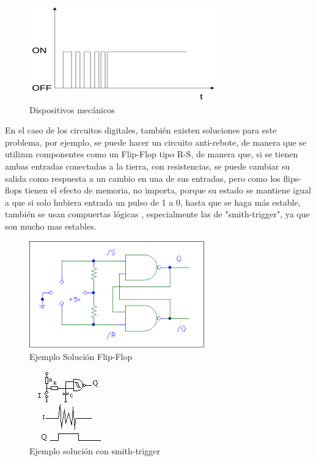 \documentclass[journal,trans]{IEEEtran}
\begin{document}
	\begin{figure}[hbtp]
		\centering
		\includegraphics[scale = 0.5]{imagenes/efectoRebote.png}
		\caption[Figura1]{Dispositivos mecánicos \cite{rebote}}
		\label{fig:EfectoRebo}
	\end{figure}
	
	
	En el caso de los circuitos digitales, también existen soluciones para este problema, por ejemplo, se puede hacer un circuito anti-rebote, de manera que se utilizan componentes como un Flip-Flop tipo  R-S, de manera que, si se tienen ambas entradas conectadas a la tierra, con resistencias, se puede cambiar su salida como respuesta a un cambio en una de sus entradas, pero como los flips-flops tienen el efecto de memoria, no importa, porque su estado se mantiene igual a que si solo hubiera entrada un pulso de 1 a 0, hasta que se haga m\'as estable, también se usan compuertas l\'ogicas , especialmente las de "smith-trigger", ya que son mucho mas estables.
	
	\begin{figure}[h]
		\centering
		\includegraphics[scale=0.6]{imagenes/flipflopsrebote.png}
		\caption{Ejemplo Solución Flip-Flop \cite{rebote}}
		\label{fig:tikz-flipflop}
	\end{figure}
	
	\begin{figure}[h]
		\centering
		\includegraphics[scale=0.7]{imagenes/smith.png}
		\caption{Ejemplo solución con smith-trigger \cite{rebote}}
		\label{fig:tikz-smith}
	\end{figure}
	
\end{document}
